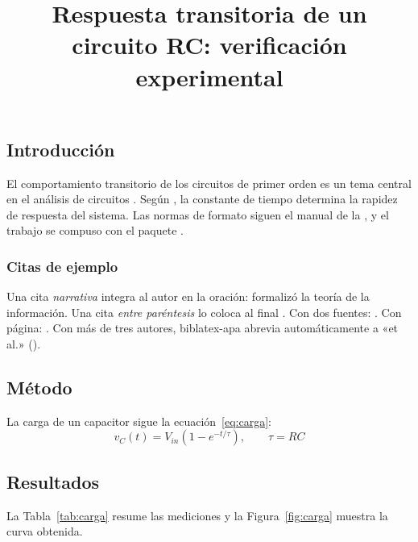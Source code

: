 \documentclass[stu,12pt,a4paper,floatsintext]{apa7}
\title{Respuesta transitoria de un circuito RC: verificación experimental}
\begin{document}
\maketitle


\subsection{Introducción}
El comportamiento transitorio de los circuitos de primer orden es un tema
central en el análisis de circuitos \parencite{boylestad2023}. Según
\textcite{sedra2020}, la constante de tiempo determina la rapidez de respuesta
del sistema. Las normas de formato siguen el manual de la
\textcite{apa2020}, y el trabajo se compuso con el paquete
\textcite{weiss_apa7}.

\subsubsection{Citas de ejemplo}
Una cita \emph{narrativa} integra al autor en la oración:
\textcite{shannon1948} formalizó la teoría de la información. Una cita
\emph{entre paréntesis} lo coloca al final \parencite{kasneci2023}. Con dos
fuentes: \parencite{vaswani2017,shannon1948}. Con página:
\parencite[p.~381]{shannon1948}. Con más de tres autores, biblatex-apa abrevia
automáticamente a «et al.» (\cite{kasneci2023}).

\subsection{Método}
La carga de un capacitor sigue la ecuación~\eqref{eq:carga}:
\begin{equation}
  v_C(t) = V_{in}\left(1 - e^{-t/\tau}\right), \qquad \tau = RC
  \label{eq:carga}
\end{equation}

\subsection{Resultados}
La Tabla~\ref{tab:carga} resume las mediciones y la Figura~\ref{fig:carga}
muestra la curva obtenida.
\end{document}
